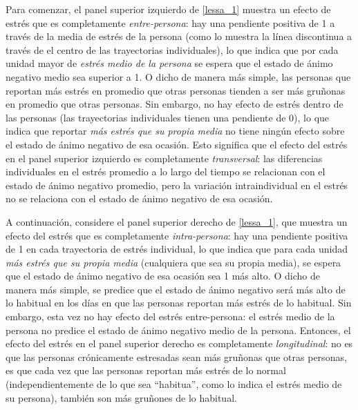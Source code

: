 \documentclass[spanish]{article}
\numberwithin{figure}{subsection}
\numberwithin{equation}{subsection}
\numberwithin{table}{subsection}
\begin{document}
Para comenzar, el panel superior izquierdo de \ref{lessa_1} muestra un efecto de estrés que es completamente
\textit{entre-persona}: hay una pendiente positiva de 1 a través de la media de estrés de la persona (como lo muestra la
línea discontinua a través de el centro de las trayectorias individuales), lo que indica que por cada unidad mayor de
\textit{estrés medio de la persona} se espera que el estado de ánimo negativo medio sea superior a 1. O dicho de manera más
simple, las personas que reportan más estrés en promedio que otras personas tienden a ser más gruñonas en promedio que
otras personas. Sin embargo, no hay efecto de estrés dentro de las personas (las trayectorias individuales tienen una
pendiente de 0), lo que indica que reportar \textit{más estrés que su propia media} no tiene ningún efecto sobre el estado
de ánimo negativo de esa ocasión. Esto significa que el efecto del estrés en el panel superior izquierdo es completamente
\textit{transversal}: las diferencias individuales en el estrés promedio a lo largo del tiempo se relacionan con el estado de
ánimo negativo promedio, pero la variación intraindividual en el estrés no se relaciona con el estado de ánimo negativo de
esa ocasión.

A continuación, considere el panel superior derecho de \ref{lessa_1}, que muestra un efecto del estrés que es completamente
\textit{intra-persona}: hay una pendiente positiva de 1 en cada trayectoria de estrés individual, lo que indica que
para cada unidad \textit{más estrés que su propia media} (cualquiera que sea su propia media), se espera que el estado de
ánimo negativo de esa ocasión sea 1 más alto. O dicho de manera más simple, se predice que el estado de ánimo negativo
será más alto de lo habitual en los días en que las personas reportan más estrés de lo habitual. Sin embargo, esta vez no
hay efecto del estrés entre-persona: el estrés medio de la persona no predice el estado de ánimo negativo medio de la persona.
Entonces, el efecto del estrés en el panel superior derecho es completamente \textit{longitudinal}: no es que las personas
crónicamente estresadas sean más gruñonas que otras personas, es que cada vez que las personas reportan más estrés de
lo normal (independientemente de lo que sea ``habitua'', como lo indica el estrés medio de su persona), también son más
gruñones de lo habitual.
\end{document}
